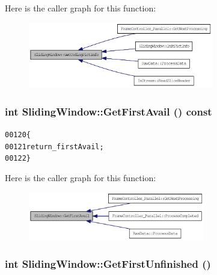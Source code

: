 Here is the caller graph for this function:\nopagebreak
\begin{figure}[H]
\begin{center}
\leavevmode
\includegraphics[width=229pt]{class_sliding_window_ac50874323a2aaa4ef76fab47f80c9f92_icgraph}
\end{center}
\end{figure}


\hypertarget{class_sliding_window_a2128091c76b407cd0e244759ba5a2846}{
\subsubsection[{GetFirstAvail}]{\setlength{\rightskip}{0pt plus 5cm}int SlidingWindow::GetFirstAvail () const}}
\label{class_sliding_window_a2128091c76b407cd0e244759ba5a2846}




\begin{footnotesize}\begin{alltt}
00120         \{
00121                 \textcolor{keywordflow}{return} \_firstAvail;
00122         \}
\end{alltt}\end{footnotesize}




Here is the caller graph for this function:\nopagebreak
\begin{figure}[H]
\begin{center}
\leavevmode
\includegraphics[width=218pt]{class_sliding_window_a2128091c76b407cd0e244759ba5a2846_icgraph}
\end{center}
\end{figure}


\hypertarget{class_sliding_window_a3be69abc76bff5b71ab96dadcced9f65}{
\subsubsection[{GetFirstUnfinished}]{\setlength{\rightskip}{0pt plus 5cm}int SlidingWindow::GetFirstUnfinished ()}}
\label{class_sliding_window_a3be69abc76bff5b71ab96dadcced9f65}




